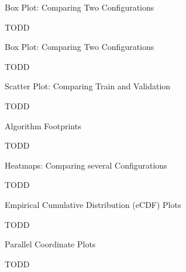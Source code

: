 \begin{frame}[c]{Box Plot: Comparing Two Configurations}

TODD


\end{frame}
\begin{frame}[c]{Box Plot: Comparing Two Configurations}

TODD


\end{frame}
\begin{frame}[c]{Scatter Plot: Comparing Train and Validation}

TODD


\end{frame}
\begin{frame}[c]{Algorithm Footprints }

TODD


\end{frame}
\begin{frame}[c]{Heatmaps: Comparing several Configurations}

TODD


\end{frame}
\begin{frame}[c]{Empirical Cumulative Distribution (eCDF) Plots}

TODD


\end{frame}
\begin{frame}[c]{Parallel Coordinate Plots}

TODD


\end{frame}
